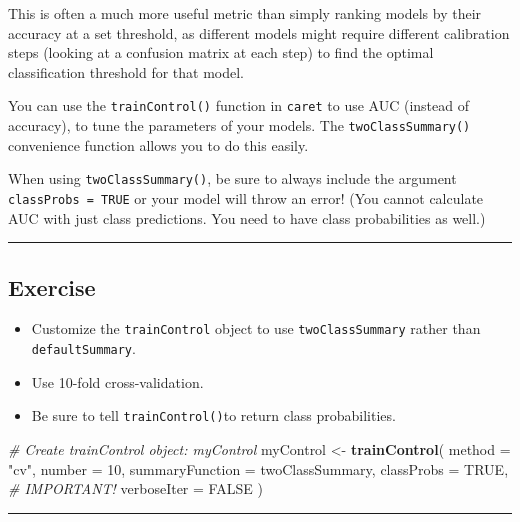\documentclass[
]{book}
\newenvironment{Shaded}{\begin{snugshade}}{\end{snugshade}}
\newcommand{\CommentTok}[1]{\textcolor[rgb]{0.56,0.35,0.01}{\textit{#1}}}
\newcommand{\DataTypeTok}[1]{\textcolor[rgb]{0.13,0.29,0.53}{#1}}
\newcommand{\DecValTok}[1]{\textcolor[rgb]{0.00,0.00,0.81}{#1}}
\newcommand{\KeywordTok}[1]{\textcolor[rgb]{0.13,0.29,0.53}{\textbf{#1}}}
\newcommand{\NormalTok}[1]{#1}
\newcommand{\OtherTok}[1]{\textcolor[rgb]{0.56,0.35,0.01}{#1}}
\newcommand{\StringTok}[1]{\textcolor[rgb]{0.31,0.60,0.02}{#1}}
\begin{document}
This is often a much more useful metric than simply ranking models by their accuracy at a set threshold, as different models might require different calibration steps (looking at a confusion matrix at each step) to find the optimal classification threshold for that model.

You can use the \texttt{trainControl()} function in \texttt{caret} to use AUC (instead of accuracy), to tune the parameters of your models. The \texttt{twoClassSummary()} convenience function allows you to do this easily.

When using \texttt{twoClassSummary()}, be sure to always include the argument \texttt{classProbs\ =\ TRUE} or your model will throw an error! (You cannot calculate AUC with just class predictions. You need to have class probabilities as well.)

\begin{center}\rule{0.5\linewidth}{0.5pt}\end{center}

\hypertarget{exercise-15}{%
\subsection*{Exercise}\label{exercise-15}}

\begin{itemize}
\item
  Customize the \texttt{trainControl} object to use \texttt{twoClassSummary} rather than \texttt{defaultSummary}.
\item
  Use 10-fold cross-validation.
\item
  Be sure to tell \texttt{trainControl()}to return class probabilities.
\end{itemize}

\begin{Shaded}
\begin{Highlighting}[]
\CommentTok{# Create trainControl object: myControl}
\NormalTok{myControl <-}\StringTok{ }\KeywordTok{trainControl}\NormalTok{(}
  \DataTypeTok{method =} \StringTok{"cv"}\NormalTok{,}
  \DataTypeTok{number =} \DecValTok{10}\NormalTok{,}
  \DataTypeTok{summaryFunction =}\NormalTok{ twoClassSummary,}
  \DataTypeTok{classProbs =} \OtherTok{TRUE}\NormalTok{, }\CommentTok{# IMPORTANT!}
  \DataTypeTok{verboseIter =} \OtherTok{FALSE}
\NormalTok{)}
\end{Highlighting}
\end{Shaded}

\begin{center}\rule{0.5\linewidth}{0.5pt}\end{center}
\end{document}
